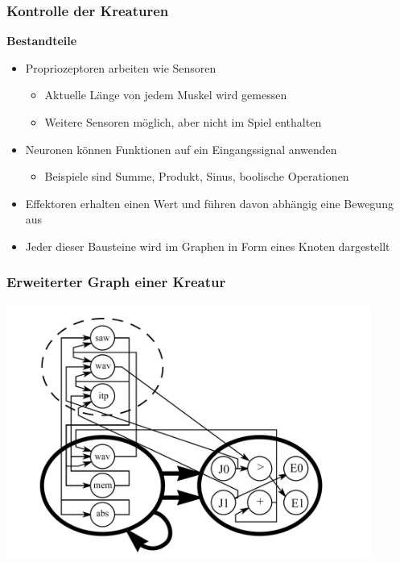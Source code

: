 \documentclass{beamer}
\begin{document}
\begin{frame}
	\frametitle{Kontrolle der Kreaturen}
	\textbf{Bestandteile}\\ \pause
	\begin{itemize}
		\item Propriozeptoren arbeiten wie Sensoren \pause
		\begin{itemize}
			\item Aktuelle Länge von jedem Muskel wird gemessen \pause
			\item Weitere Sensoren möglich, aber nicht im Spiel enthalten \pause
		\end{itemize}
		\item Neuronen können Funktionen auf ein Eingangssignal anwenden \pause
		\begin{itemize}
			\item Beispiele sind Summe, Produkt, Sinus, boolische Operationen \pause
		\end{itemize}
		\item Effektoren erhalten einen Wert und führen davon abhängig eine Bewegung aus
		\item Jeder dieser Bausteine wird im Graphen in Form eines Knoten dargestellt
	\end{itemize}
\end{frame}

\begin{frame}
	\frametitle{Erweiterter Graph einer Kreatur}
	\includegraphics[width=0.9\textwidth]{img/evolved_graph.png} 
\end{frame}
\end{document}
